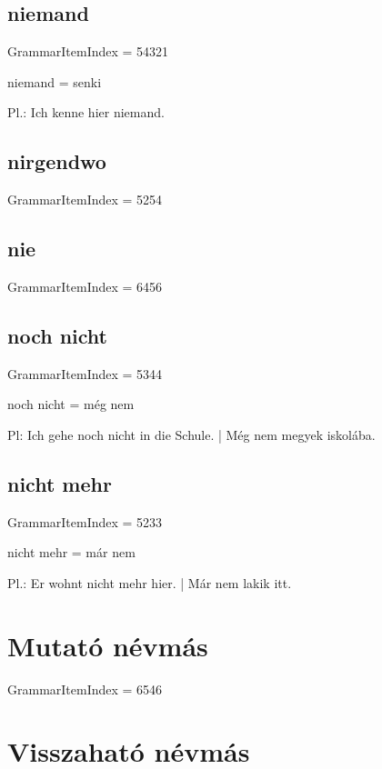 \documentclass{article}
\newenvironment{desc}{\verbatim}{\endverbatim}
\begin{document}
\subsection{niemand}

GrammarItemIndex = 54321

\begin{desc}
niemand = senki

Pl.: Ich kenne hier niemand.
\end{desc}

\subsection{nirgendwo}

GrammarItemIndex = 5254

\subsection{nie}

GrammarItemIndex = 6456

\subsection{noch nicht}

GrammarItemIndex = 5344

\begin{desc}
noch nicht = még nem

Pl: Ich gehe noch nicht in die Schule. | Még nem megyek iskolába.
\end{desc}

\subsection{nicht mehr}

GrammarItemIndex = 5233

\begin{desc}
nicht mehr = már nem

Pl.: Er wohnt nicht mehr hier. | Már nem lakik itt.
\end{desc}

\section{Mutató névmás}

GrammarItemIndex = 6546

\section{Visszaható névmás}
\end{document}
